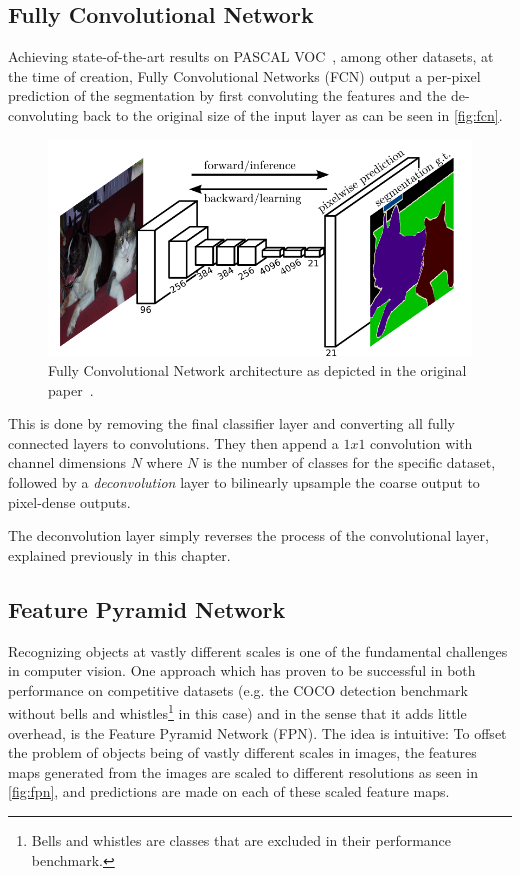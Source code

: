 \documentclass[english, bibtex]{kththesis}
\begin{document}
\subsection{Fully Convolutional Network}

Achieving state-of-the-art results on PASCAL VOC~\cite{DBLP:journals/corr/LongSD14}, among other datasets, at the time of creation, Fully Convolutional Networks (FCN) output a per-pixel prediction of the segmentation by first convoluting the features and the de-convoluting back to the original size of the input layer as can be seen in \autoref{fig:fcn}. 

\begin{figure}[H]
  \begin{center}
    \includegraphics[width=1.0\textwidth]{figures/fcn.png}
  \end{center}
  \caption{Fully Convolutional Network architecture as depicted in the original paper~\cite{DBLP:journals/corr/LongSD14}.}
  \label{fig:fcn}
\end{figure}

This is done by removing the final classifier layer and converting all fully connected layers to convolutions. They then append a $ 1 x 1$ convolution with channel dimensions $N$ where $N$ is the number of classes for the specific dataset, followed by a \textit{deconvolution} layer to bilinearly upsample the coarse output to pixel-dense outputs.

The deconvolution layer simply reverses the process of the convolutional layer, explained previously in this chapter.

\subsection{Feature Pyramid Network}

Recognizing objects at vastly different scales is one of the fundamental challenges in computer vision. One approach which has proven to be successful in both performance on competitive datasets (e.g. the COCO detection benchmark without bells and whistles\footnote{Bells and whistles are classes that are excluded in their performance benchmark.} in this case) and in the sense that it adds little overhead, is the Feature Pyramid Network (FPN). The idea is intuitive: To offset the problem of objects being of vastly different scales in images, the features maps generated from the images are scaled to different resolutions as seen in \autoref{fig:fpn}, and predictions are made on each of these scaled feature maps.
\end{document}
